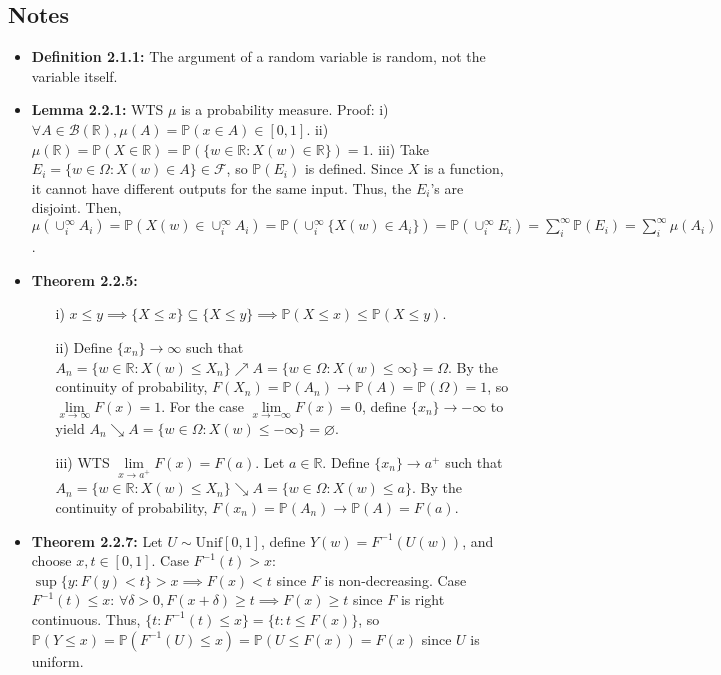 \documentclass[12pt]{article}
\newcommand{\p}{\mathbb{P}}
\begin{document}
\subsection*{Notes}
\begin{itemize}
    \item \textbf{Definition 2.1.1:} The argument of a random variable is random, not the variable itself.
    \item \textbf{Lemma 2.2.1:} WTS $\mu$ is a probability measure. Proof: i) $\forall A \in \mathcal{B}(\mathbb{R}), \mu(A) = \p(x \in A) \in [0,1]$. ii) $\mu(\mathbb{R}) = \p(X \in \mathbb{R}) = \p(\{w \in \mathbb{R}: X(w) \in \mathbb{R}\}) = 1$. iii) Take $E_i = \{w \in \Omega: X(w) \in A\} \in \mathcal{F}$, so $\p(E_i)$ is defined. Since $X$ is a function, it cannot have different outputs for the same input. Thus, the $E_i$'s are disjoint. Then, $\mu(\cup_i^\infty A_i) = \p(X(w) \in \cup_i^\infty A_i) = \p(\cup_i^\infty \{X(w) \in A_i\}) = \p(\cup_i^\infty E_i) = \sum_i^\infty \p(E_i) = \sum_i^\infty \mu(A_i)$.
    \item \textbf{Theorem 2.2.5:}
    \begin{itemize}
        \item [i)] $x \leq y \implies \{X \leq x\} \subseteq \{X \leq y\} \implies \p(X \leq x) \leq \p(X \leq y)$.
        \item [ii)] Define $\{x_n\} \to \infty$ such that $A_n = \{w \in \mathbb{R}: X(w) \leq X_n\} \nearrow A = \{w \in \Omega: X(w) \leq \infty\} = \Omega$. By the continuity of probability, $F(X_n) = \p(A_n) \to \p(A) = \p(\Omega) = 1$, so $\lim \limits_{x \to \infty} F(x) = 1$. For the case $\lim \limits_{x \to -\infty} F(x) = 0$, define $\{x_n\} \to -\infty$ to yield $A_n \searrow A = \{w \in \Omega: X(w) \leq -\infty\} = \varnothing$.
        \item [iii)] WTS $\lim \limits_{x \to a^+} F(x) = F(a)$. Let $a \in \mathbb{R}$. Define $\{x_n\} \to a^+$ such that $A_n = \{w \in \mathbb{R}: X(w) \leq X_n\} \searrow A = \{w \in \Omega: X(w) \leq a\}$. By the continuity of probability, $F(x_n) = \p(A_n) \to \p(A) = F(a)$.
    \end{itemize}
    \item \textbf{Theorem 2.2.7:} Let $U \sim \text{Unif}[0,1]$, define $Y(w) = F^{-1}(U(w))$, and choose $x, t \in [0,1]$. Case $F^{-1}(t) > x$: $\sup\{y: F(y) < t\} > x \implies F(x) < t$ since $F$ is non-decreasing. Case $F^{-1}(t) \leq x$: $\forall \delta > 0, F(x + \delta) \geq t \implies F(x) \geq t$ since $F$ is right continuous. Thus, $\{t: F^{-1}(t) \leq x\} = \{t: t \leq F(x)\}$, so $\p(Y \leq x) = \p(F^{-1}(U) \leq x) = \p(U \leq F(x)) = F(x)$ since $U$ is uniform.

\end{itemize}
\end{document}
